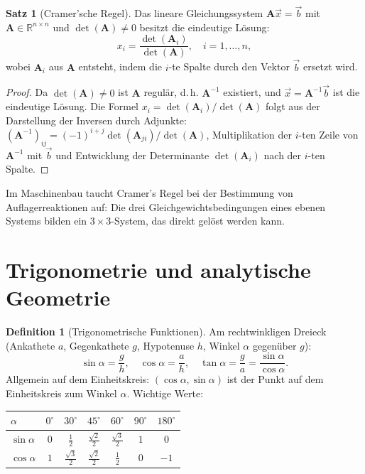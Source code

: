 ﻿\documentclass[a4paper,12pt]{report}
\theoremstyle{definition}
\newtheorem{definition}{Definition}
\newtheorem{satz}{Satz}
\begin{document}
\begin{satz}[Cramer'sche Regel]
Das lineare Gleichungssystem $\mathbf{A}\vec{x} = \vec{b}$ mit $\mathbf{A} \in \mathbb{R}^{n\times n}$
und $\det(\mathbf{A}) \neq 0$ besitzt die eindeutige L\"osung:
\[
  x_i = \frac{\det(\mathbf{A}_i)}{\det(\mathbf{A})}, \quad i = 1, \ldots, n,
\]
wobei $\mathbf{A}_i$ aus $\mathbf{A}$ entsteht, indem die $i$-te Spalte
durch den Vektor $\vec{b}$ ersetzt wird.
\end{satz}
\begin{proof}
Da $\det(\mathbf{A}) \neq 0$ ist $\mathbf{A}$ regul\"ar, d.\,h. $\mathbf{A}^{-1}$
existiert, und $\vec{x} = \mathbf{A}^{-1}\vec{b}$ ist die eindeutige L\"osung.
Die Formel $x_i = \det(\mathbf{A}_i)/\det(\mathbf{A})$ folgt aus der
Darstellung der Inversen durch Adjunkte:
$(\mathbf{A}^{-1})_{ij} = (-1)^{i+j}\det(\mathbf{A}_{ji})/\det(\mathbf{A})$,
Multiplikation der $i$-ten Zeile von $\mathbf{A}^{-1}$ mit $\vec{b}$ und
Entwicklung der Determinante $\det(\mathbf{A}_i)$ nach der $i$-ten Spalte.
\end{proof}

Im Maschinenbau taucht Cramer's Regel bei der Bestimmung von Auflagerreaktionen
auf: Die drei Gleichgewichtsbedingungen eines ebenen Systems bilden ein
$3\times3$-System, das direkt gel\"ost werden kann.

\section{Trigonometrie und analytische Geometrie}

\begin{definition}[Trigonometrische Funktionen]
Am rechtwinkligen Dreieck (Ankathete $a$, Gegenkathete $g$, Hypotenuse $h$,
Winkel $\alpha$ gegen\"uber $g$):
\[
  \sin\alpha = \frac{g}{h}, \quad \cos\alpha = \frac{a}{h}, \quad
  \tan\alpha = \frac{g}{a} = \frac{\sin\alpha}{\cos\alpha}.
\]
Allgemein auf dem Einheitskreis: $(\cos\alpha, \sin\alpha)$ ist der
Punkt auf dem Einheitskreis zum Winkel $\alpha$. Wichtige Werte:
\end{definition}

\begin{center}
\begin{tabular}{l*{6}{c}}
\toprule
$\alpha$ & $0^\circ$ & $30^\circ$ & $45^\circ$ & $60^\circ$ & $90^\circ$ & $180^\circ$ \\
\midrule
$\sin\alpha$ & $0$ & $\frac{1}{2}$ & $\frac{\sqrt{2}}{2}$ & $\frac{\sqrt{3}}{2}$ & $1$ & $0$ \\
$\cos\alpha$ & $1$ & $\frac{\sqrt{3}}{2}$ & $\frac{\sqrt{2}}{2}$ & $\frac{1}{2}$ & $0$ & $-1$ \\
\bottomrule
\end{tabular}
\end{center}
\end{document}
